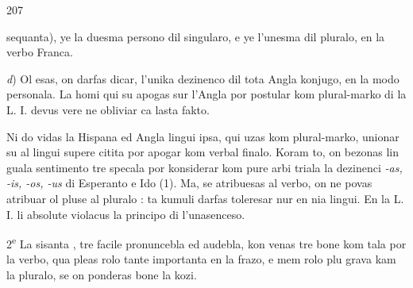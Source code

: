\begin{VUpage}[211]{207}
\VUasterismo{125.14mm}

\VUcontinue
sequanta), ye la duesma persono dil singularo, e ye l'unesma\nl
dil pluralo, en la verbo Franca.

\textit{d}) Ol esas, on darfas dicar, l'unika dezinenco dil tota\nl
Angla konjugo, en la modo personala. La homi qui su\nl
apogas sur l'Angla por postular  kom plural-marko di la\nl
L. I. devus vere ne obliviar ca lasta fakto.

Ni do vidas la Hispana ed Angla lingui ipsa, qui uzas \nl
kom plural-marko, unionar su al lingui supere citita por\nl
apogar  kom verbal finalo. Koram to, on bezonas lin\cc
guala sentimento tre specala por konsiderar kom pure arbi\cc
triala la dezinenci \textit{-as, -is, -os, -us} di Esperanto e Ido (1).\nl
Ma, se  atribuesas al verbo, on ne povas atribuar ol pluse\nl
al pluralo : ta kumuli darfas toleresar nur en nia lingui.\nl
En la L. I. li absolute violacus la principo di l'unasenceso.\parplein

2\textsuperscript{e} La sisanta , tre facile pronuncebla ed audebla, kon\cc
venas tre bone kom tala por la verbo, qua pleas rolo tante\nl
importanta en la frazo, e mem rolo plu grava kam la pluralo,\nl
se on ponderas bone la kozi.


\end{VUpage}
